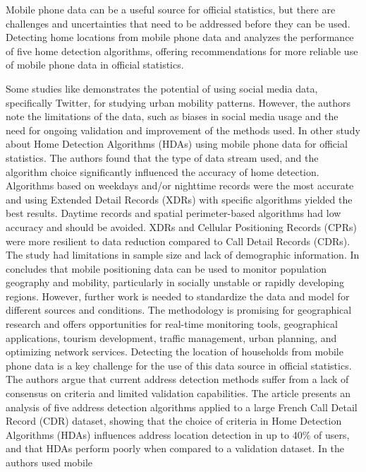 \documentclass[]{elsarticle} %
\begin{document}
Mobile phone data can be a useful source for official statistics, but
there are challenges and uncertainties that need to be addressed before
they can be used. Detecting home locations from mobile phone data and
analyzes the performance of five home detection algorithms, offering
recommendations for more reliable use of mobile phone data in official
statistics.

Some studies like \citep{osorio2019social} demonstrates the potential of
using social media data, specifically Twitter, for studying urban
mobility patterns. However, the authors note the limitations of the
data, such as biases in social media usage and the need for ongoing
validation and improvement of the methods used. In other study
\citep{pappalardo2021evaluation} about Home Detection Algorithms (HDAs)
using mobile phone data for official statistics. The authors found that
the type of data stream used, and the algorithm choice significantly
influenced the accuracy of home detection. Algorithms based on weekdays
and/or nighttime records were the most accurate and using Extended
Detail Records (XDRs) with specific algorithms yielded the best results.
Daytime records and spatial perimeter-based algorithms had low accuracy
and should be avoided. XDRs and Cellular Positioning Records (CPRs) were
more resilient to data reduction compared to Call Detail Records (CDRs).
The study had limitations in sample size and lack of demographic
information. In \citep{ahas2010using} concludes that mobile positioning
data can be used to monitor population geography and mobility,
particularly in socially unstable or rapidly developing regions.
However, further work is needed to standardize the data and model for
different sources and conditions. The methodology is promising for
geographical research and offers opportunities for real-time monitoring
tools, geographical applications, tourism development, traffic
management, urban planning, and optimizing network services. Detecting
the location of households from mobile phone data is a key challenge for
the use of this data source in official statistics. The authors argue
that current address detection methods suffer from a lack of consensus
on criteria and limited validation capabilities. The article presents an
analysis of five address detection algorithms applied to a large French
Call Detail Record (CDR) dataset, showing that the choice of criteria in
Home Detection Algorithms (HDAs) influences address location detection
in up to 40\% of users, and that HDAs perform poorly when compared to a
validation dataset. In \citep{gauvin2020gender} the authors used mobile
\end{document}

